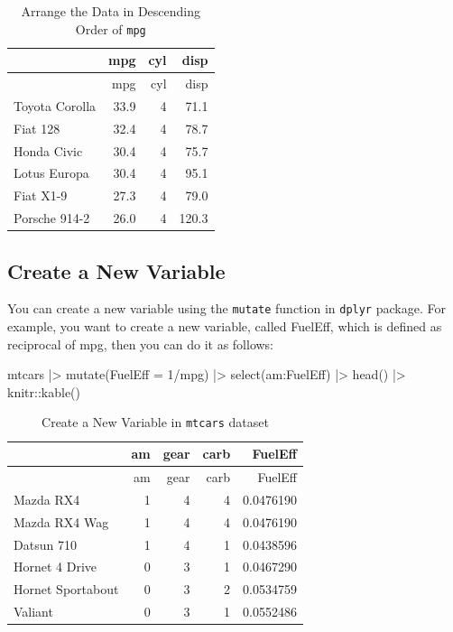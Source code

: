 \documentclass[
  letterpaper,
  paper =a4,
  twoside,
  openright,
  headsepline,
  footsepline,
  listof = totocnumbered,
  chapterprefix = true,
  firstiscover,
  parskip = full*]{scrbook}
\newenvironment{Shaded}{\begin{snugshade}}{\end{snugshade}}
\newcommand{\AttributeTok}[1]{\textcolor[rgb]{0.40,0.45,0.13}{#1}}
\newcommand{\DecValTok}[1]{\textcolor[rgb]{0.68,0.00,0.00}{#1}}
\newcommand{\FunctionTok}[1]{\textcolor[rgb]{0.28,0.35,0.67}{#1}}
\newcommand{\NormalTok}[1]{\textcolor[rgb]{0.00,0.23,0.31}{#1}}
\newcommand{\SpecialCharTok}[1]{\textcolor[rgb]{0.37,0.37,0.37}{#1}}
\begin{document}
\begin{longtable}[]{@{}lrrr@{}}
\caption{Arrange the Data in Descending Order of
\texttt{mpg}}\tabularnewline
\toprule\noalign{}
& mpg & cyl & disp \\
\midrule\noalign{}
\endfirsthead
\toprule\noalign{}
& mpg & cyl & disp \\
\midrule\noalign{}
\endhead
\bottomrule\noalign{}
\endlastfoot
Toyota Corolla & 33.9 & 4 & 71.1 \\
Fiat 128 & 32.4 & 4 & 78.7 \\
Honda Civic & 30.4 & 4 & 75.7 \\
Lotus Europa & 30.4 & 4 & 95.1 \\
Fiat X1-9 & 27.3 & 4 & 79.0 \\
Porsche 914-2 & 26.0 & 4 & 120.3 \\
\end{longtable}

\subsection{Create a New Variable}\label{create-a-new-variable}

You can create a new variable using the \texttt{mutate} function in
\texttt{dplyr} package. For example, you want to create a new variable,
called FuelEff, which is defined as reciprocal of mpg, then you can do
it as follows:

\begin{Shaded}
\begin{Highlighting}[]
\NormalTok{mtcars }\SpecialCharTok{|\textgreater{}} \FunctionTok{mutate}\NormalTok{(}\AttributeTok{FuelEff =} \DecValTok{1}\SpecialCharTok{/}\NormalTok{mpg) }\SpecialCharTok{|\textgreater{}} \FunctionTok{select}\NormalTok{(am}\SpecialCharTok{:}\NormalTok{FuelEff) }\SpecialCharTok{|\textgreater{}} \FunctionTok{head}\NormalTok{() }\SpecialCharTok{|\textgreater{}}\NormalTok{ knitr}\SpecialCharTok{::}\FunctionTok{kable}\NormalTok{()}
\end{Highlighting}
\end{Shaded}

\begin{longtable}[]{@{}lrrrr@{}}
\caption{Create a New Variable in \texttt{mtcars}
dataset}\tabularnewline
\toprule\noalign{}
& am & gear & carb & FuelEff \\
\midrule\noalign{}
\endfirsthead
\toprule\noalign{}
& am & gear & carb & FuelEff \\
\midrule\noalign{}
\endhead
\bottomrule\noalign{}
\endlastfoot
Mazda RX4 & 1 & 4 & 4 & 0.0476190 \\
Mazda RX4 Wag & 1 & 4 & 4 & 0.0476190 \\
Datsun 710 & 1 & 4 & 1 & 0.0438596 \\
Hornet 4 Drive & 0 & 3 & 1 & 0.0467290 \\
Hornet Sportabout & 0 & 3 & 2 & 0.0534759 \\
Valiant & 0 & 3 & 1 & 0.0552486 \\
\end{longtable}
\end{document}

